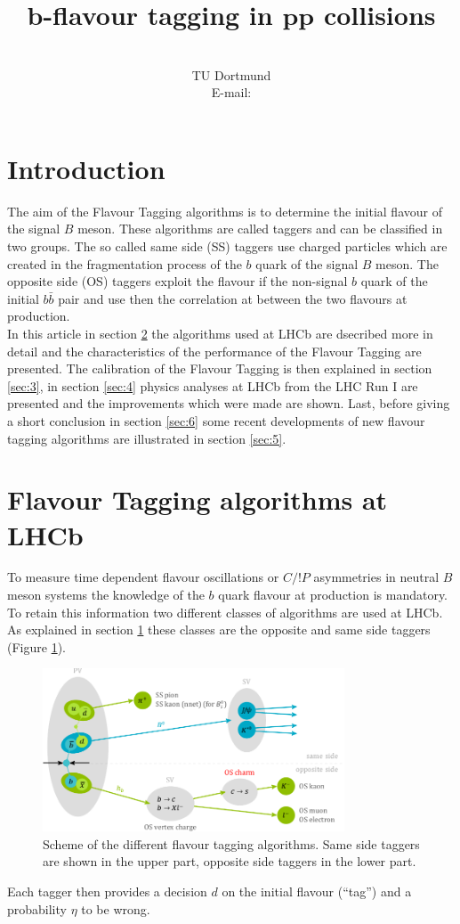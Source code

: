 \documentclass{PoS}
\title{$\bm{b}$-flavour tagging in $\bm{p\!p}$ collisions}
\author{\speaker{Alex Birnkraut}\\%
        TU Dortmund\\
        E-mail: \email{a.birnkraut@cern.ch}}
\begin{document}
\section{Introduction}\label{sec:1}

The aim of the Flavour Tagging algorithms is to determine the initial flavour of the signal $B$ meson. These algorithms are called taggers and can be classified in two groups. The so called same side (SS) taggers use charged particles which are created in the fragmentation process of the $b$ quark of the signal $B$ meson. The opposite side (OS) taggers exploit the flavour if the non-signal $b$ quark of the initial $b\bar{b}$ pair and use then the correlation at between the two flavours at production.\\
In this article in section \ref{sec:2} the algorithms used at LHCb are dsecribed more in detail and the characteristics of the performance of the Flavour Tagging are presented. The calibration of the Flavour Tagging is then explained in section \ref{sec:3}, in section \ref{sec:4} physics analyses at LHCb from the LHC Run I are presented and the improvements which were made are shown. Last, before giving a short conclusion in section \ref{sec:6} some recent developments of new flavour tagging algorithms are illustrated in section \ref{sec:5}. 

\section{Flavour Tagging algorithms at LHCb}\label{sec:2}

To measure time dependent flavour oscillations or $C/!P$ asymmetries  in neutral $B$ meson systems the knowledge of the $b$ quark flavour at production is mandatory. To retain this information two different classes of algorithms are used at LHCb. As explained in section \ref{sec:1} these classes are the opposite and same side taggers (Figure \ref{fig:flavtagscheme}).
\begin{figure}[htbp]
	\begin{center}
		\includegraphics[width=0.8\textwidth, angle=0]{figs/FlavourTaggerScheme.pdf}
		\caption{Scheme of the different flavour tagging algorithms. Same side taggers are shown in the upper part, opposite side taggers in the lower part.}
		\label{fig:flavtagscheme}
	\end{center}
\end{figure}
Each tagger then provides a decision $d$ on the initial flavour (\enquote{tag}) and a probability $\eta$ to be wrong.
\end{document}
